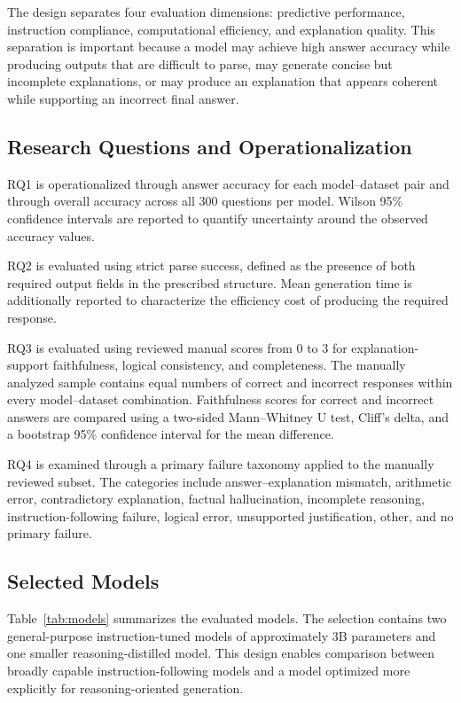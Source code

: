 \documentclass{article}
\begin{document}
The design separates four evaluation dimensions: predictive
performance, instruction compliance, computational efficiency, and
explanation quality. This separation is important because a model may
achieve high answer accuracy while producing outputs that are difficult
to parse, may generate concise but incomplete explanations, or may
produce an explanation that appears coherent while supporting an
incorrect final answer.

\subsection{Research Questions and Operationalization}

RQ1 is operationalized through answer accuracy for each
model--dataset pair and through overall accuracy across all 300
questions per model. Wilson 95\% confidence intervals are reported to
quantify uncertainty around the observed accuracy values.

RQ2 is evaluated using strict parse success, defined as the presence
of both required output fields in the prescribed structure. Mean
generation time is additionally reported to characterize the
efficiency cost of producing the required response.

RQ3 is evaluated using reviewed manual scores from 0 to 3 for
explanation-support faithfulness, logical consistency, and
completeness. The manually analyzed sample contains equal numbers of
correct and incorrect responses within every model--dataset
combination. Faithfulness scores for correct and incorrect answers are
compared using a two-sided Mann--Whitney U test, Cliff's delta, and a
bootstrap 95\% confidence interval for the mean difference.

RQ4 is examined through a primary failure taxonomy applied to the
manually reviewed subset. The categories include answer--explanation
mismatch, arithmetic error, contradictory explanation, factual
hallucination, incomplete reasoning, instruction-following failure,
logical error, unsupported justification, other, and no primary
failure.

\subsection{Selected Models}

Table~\ref{tab:models} summarizes the evaluated models. The selection
contains two general-purpose instruction-tuned models of approximately
3B parameters and one smaller reasoning-distilled model. This design
enables comparison between broadly capable instruction-following
models and a model optimized more explicitly for reasoning-oriented
generation.
\end{document}
